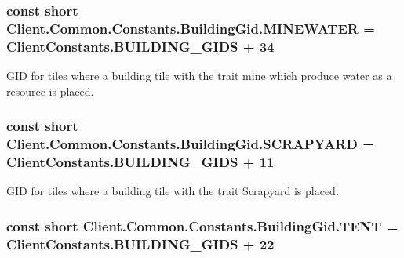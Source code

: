 \subsubsection[{M\+I\+N\+E\+W\+A\+T\+E\+R}]{\setlength{\rightskip}{0pt plus 5cm}const short Client.\+Common.\+Constants.\+Building\+Gid.\+M\+I\+N\+E\+W\+A\+T\+E\+R = {\bf Client\+Constants.\+B\+U\+I\+L\+D\+I\+N\+G\+\_\+\+G\+I\+D\+S} + 34}\label{classClient_1_1Common_1_1Constants_1_1BuildingGid_a6a3a47119f9286cc5ebe703bcf3113ee}


G\+I\+D for tiles where a building tile with the trait mine which produce water as a resource is placed. 

\hypertarget{classClient_1_1Common_1_1Constants_1_1BuildingGid_a733cb9902af81d9ca9bc0fa64e44a1e0}{}
\subsubsection[{S\+C\+R\+A\+P\+Y\+A\+R\+D}]{\setlength{\rightskip}{0pt plus 5cm}const short Client.\+Common.\+Constants.\+Building\+Gid.\+S\+C\+R\+A\+P\+Y\+A\+R\+D = {\bf Client\+Constants.\+B\+U\+I\+L\+D\+I\+N\+G\+\_\+\+G\+I\+D\+S} + 11}\label{classClient_1_1Common_1_1Constants_1_1BuildingGid_a733cb9902af81d9ca9bc0fa64e44a1e0}


G\+I\+D for tiles where a building tile with the trait Scrapyard is placed. 

\hypertarget{classClient_1_1Common_1_1Constants_1_1BuildingGid_a3a87d1e77adbbeef8c62225877887dff}{}
\subsubsection[{T\+E\+N\+T}]{\setlength{\rightskip}{0pt plus 5cm}const short Client.\+Common.\+Constants.\+Building\+Gid.\+T\+E\+N\+T = {\bf Client\+Constants.\+B\+U\+I\+L\+D\+I\+N\+G\+\_\+\+G\+I\+D\+S} + 22}\label{classClient_1_1Common_1_1Constants_1_1BuildingGid_a3a87d1e77adbbeef8c62225877887dff}


